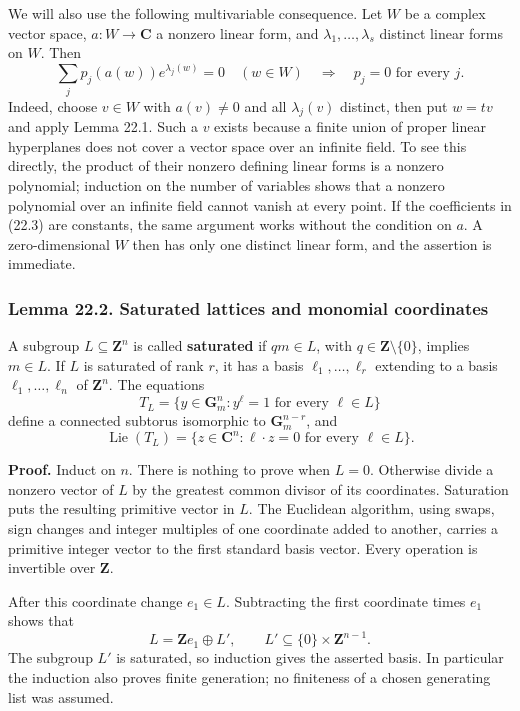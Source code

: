 \documentclass[
  11pt,
  a4paper,
]{article}
\begin{document}
We will also use the following multivariable consequence. Let \(W\) be a
complex vector space, \(a:W\to\mathbf C\) a nonzero linear form, and
\(\lambda_1,\ldots,\lambda_s\) distinct linear forms on \(W\). Then \[
 \sum_j p_j(a(w))e^{\lambda_j(w)}=0\quad(w\in W)
 \quad\Longrightarrow\quad p_j=0\text{ for every }j.
 \tag{22.3}
\] Indeed, choose \(v\in W\) with \(a(v)\ne0\) and all \(\lambda_j(v)\)
distinct, then put \(w=tv\) and apply Lemma 22.1. Such a \(v\) exists
because a finite union of proper linear hyperplanes does not cover a
vector space over an infinite field. To see this directly, the product
of their nonzero defining linear forms is a nonzero polynomial;
induction on the number of variables shows that a nonzero polynomial
over an infinite field cannot vanish at every point. If the coefficients
in (22.3) are constants, the same argument works without the condition
on \(a\). A zero-dimensional \(W\) then has only one distinct linear
form, and the assertion is immediate.

\subsubsection{Lemma 22.2. Saturated lattices and monomial
coordinates}\label{lemma-22.2.-saturated-lattices-and-monomial-coordinates}

A subgroup \(L\subseteq\mathbf Z^n\) is called \textbf{saturated} if
\(qm\in L\), with \(q\in\mathbf Z\setminus\{0\}\), implies \(m\in L\).
If \(L\) is saturated of rank \(r\), it has a basis
\(\ell_1,\ldots,\ell_r\) extending to a basis \(\ell_1,\ldots,\ell_n\)
of \(\mathbf Z^n\). The equations \[
 T_L=\{y\in\mathbf G_m^n:y^\ell=1\text{ for every }\ell\in L\}
 \tag{22.4}
\] define a connected subtorus isomorphic to \(\mathbf G_m^{n-r}\), and
\[
 \operatorname{Lie}(T_L)=\{z\in\mathbf C^n : \ell\cdot z=0
                          \text{ for every }\ell\in L\}.
 \tag{22.5}
\]

\textbf{Proof.} Induct on \(n\). There is nothing to prove when \(L=0\).
Otherwise divide a nonzero vector of \(L\) by the greatest common
divisor of its coordinates. Saturation puts the resulting primitive
vector in \(L\). The Euclidean algorithm, using swaps, sign changes and
integer multiples of one coordinate added to another, carries a
primitive integer vector to the first standard basis vector. Every
operation is invertible over \(\mathbf Z\).

After this coordinate change \(e_1\in L\). Subtracting the first
coordinate times \(e_1\) shows that \[
 L=\mathbf Ze_1\oplus L',\qquad L'\subseteq\{0\}\times\mathbf Z^{n-1}.
\] The subgroup \(L'\) is saturated, so induction gives the asserted
basis. In particular the induction also proves finite generation; no
finiteness of a chosen generating list was assumed.
\end{document}
